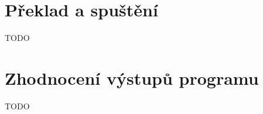 \section{Překlad a spuštění}

TODO

\section{Zhodnocení výstupů programu}\label{Jbyco:Results}

TODO\\
          

